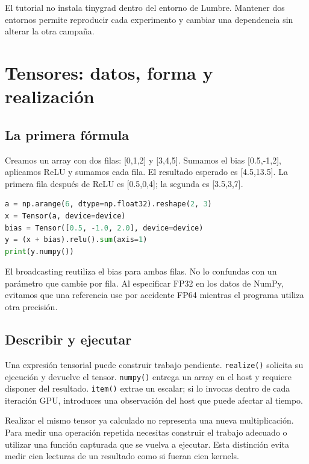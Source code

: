 \documentclass[12pt,a4paper,oneside]{report}
\begin{document}
El tutorial no instala tinygrad dentro del entorno de Lumbre. Mantener dos entornos permite reproducir cada experimento y cambiar una dependencia sin alterar la otra campaña.

\chapter{Tensores: datos, forma y realización}
\section{La primera fórmula}
Creamos un array con dos filas: [0,1,2] y [3,4,5]. Sumamos el bias [0.5,-1,2], aplicamos ReLU y sumamos cada fila. El resultado esperado es [4.5,13.5]. La primera fila después de ReLU es [0.5,0,4]; la segunda es [3.5,3,7].

\begin{lstlisting}[language=Python]
a = np.arange(6, dtype=np.float32).reshape(2, 3)
x = Tensor(a, device=device)
bias = Tensor([0.5, -1.0, 2.0], device=device)
y = (x + bias).relu().sum(axis=1)
print(y.numpy())
\end{lstlisting}
El broadcasting reutiliza el bias para ambas filas. No lo confundas con un parámetro que cambie por fila. Al especificar FP32 en los datos de NumPy, evitamos que una referencia use por accidente FP64 mientras el programa utiliza otra precisión.

\section{Describir y ejecutar}
Una expresión tensorial puede construir trabajo pendiente. \texttt{realize()} solicita su ejecución y devuelve el tensor. \texttt{numpy()} entrega un array en el host y requiere disponer del resultado. \texttt{item()} extrae un escalar; si lo invocas dentro de cada iteración GPU, introduces una observación del host que puede afectar al tiempo.

\begin{center}
\end{center}
Realizar el mismo tensor ya calculado no representa una nueva multiplicación. Para medir una operación repetida necesitas construir el trabajo adecuado o utilizar una función capturada que se vuelva a ejecutar. Esta distinción evita medir cien lecturas de un resultado como si fueran cien kernels.
\end{document}
